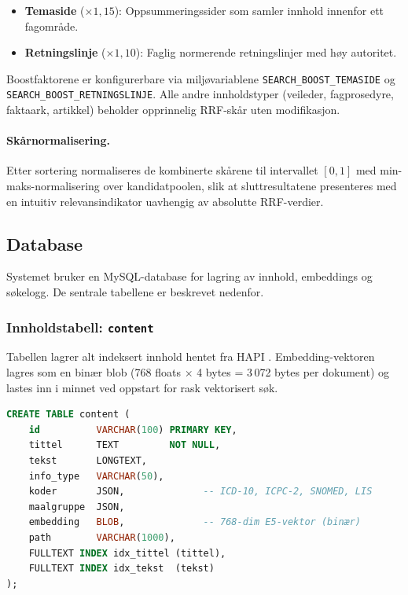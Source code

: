\begin{itemize}
    \item \textbf{Temaside} ($\times 1{,}15$): Oppsummeringssider som samler
          innhold innenfor ett fagområde.
    \item \textbf{Retningslinje} ($\times 1{,}10$): Faglig normerende
          retningslinjer med høy autoritet.
\end{itemize}

Boostfaktorene er konfigurerbare via miljøvariablene
\texttt{SEARCH\_BOOST\_TEMASIDE} og \texttt{SEARCH\_BOOST\_RETNINGSLINJE}.
Alle andre innholdstyper (veileder, fagprosedyre, faktaark, artikkel) beholder
opprinnelig RRF-skår uten modifikasjon.

\paragraph{Skårnormalisering.}
Etter sortering normaliseres de kombinerte skårene til intervallet $[0,1]$
med min-maks-normalisering over kandidatpoolen, slik at sluttresultatene
presenteres med en intuitiv relevansindikator uavhengig av absolutte
RRF-verdier.

\subsection{Database}
\label{sec:database}

Systemet bruker en MySQL-database for lagring av innhold, embeddings og
søkelogg. De sentrale tabellene er beskrevet nedenfor.

\subsubsection*{Innholdstabell: \texttt{content}}

Tabellen lagrer alt indeksert innhold hentet fra HAPI
\cite{helsedirektoratetAPI}. Embedding-vektoren lagres som en binær blob
(768 floats $\times$ 4 bytes = 3\,072 bytes per dokument) og lastes inn i
minnet ved oppstart for rask vektorisert søk.

\begin{lstlisting}[language=SQL,
    caption={Forenklet skjema for \texttt{content}-tabellen.},
    label={lst:db-content}]
CREATE TABLE content (
    id          VARCHAR(100) PRIMARY KEY,
    tittel      TEXT         NOT NULL,
    tekst       LONGTEXT,
    info_type   VARCHAR(50),
    koder       JSON,              -- ICD-10, ICPC-2, SNOMED, LIS
    maalgruppe  JSON,
    embedding   BLOB,              -- 768-dim E5-vektor (binær)
    path        VARCHAR(1000),
    FULLTEXT INDEX idx_tittel (tittel),
    FULLTEXT INDEX idx_tekst  (tekst)
);
\end{lstlisting}

